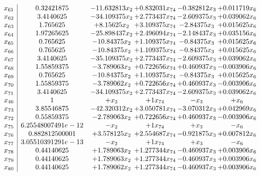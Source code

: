 \documentclass[11pt]{article}
\begin{document}
\[\begin{array}{c| c c@{\hskip 2pt} c@{\hskip 2pt} c@{\hskip 2pt} c@{\hskip 2pt} }
 x_{61}   &  0.32421875 & -11.632813 x_{2} & + 0.832031 x_{74} & -0.382812 x_{3} & + 0.011719 x_{6}\\
 x_{62}   &  3.4140625 & -34.109375 x_{2} & + 2.773437 x_{74} & -2.609375 x_{3} & + 0.039062 x_{6}\\
 x_{63}   &  1.765625 & + 8.15625 x_{2} & + 3.109375 x_{74} & -2.84375 x_{3} & + 0.015625 x_{6}\\
 x_{64}   &  1.97265625 & -25.898437 x_{2} & + 2.496094 x_{74} & -2.148437 x_{3} & + 0.035156 x_{6}\\
 x_{65}   &  0.765625 & -10.84375 x_{2} & + 1.109375 x_{74} & -0.84375 x_{3} & + 0.015625 x_{6}\\
 x_{66}   &  0.765625 & -10.84375 x_{2} & + 1.109375 x_{74} & -0.84375 x_{3} & + 0.015625 x_{6}\\
 x_{67}   &  3.4140625 & -35.109375 x_{2} & + 2.773437 x_{74} & -2.609375 x_{3} & + 0.039062 x_{6}\\
 x_{68}   &  1.55859375 & -3.789063 x_{2} & + 0.722656 x_{74} & + 0.460937 x_{3} & -0.003906 x_{6}\\
 x_{69}   &  0.765625 & -10.84375 x_{2} & + 1.109375 x_{74} & -0.84375 x_{3} & + 0.015625 x_{6}\\
 x_{70}   &  1.55859375 & -3.789062 x_{2} & + 0.722656 x_{74} & + 0.460937 x_{3} & -0.003906 x_{6}\\
 x_{71}   &  3.4140625 & -34.109375 x_{2} & + 2.773437 x_{74} & -2.609375 x_{3} & + 0.039062 x_{6}\\
 x_{46}   &  1 & +  x_{2} & + 1 x_{74} & - x_{3} & +  x_{6}\\
 x_{73}   &  3.85546875 & -42.320312 x_{2} & + 3.050781 x_{74} & -3.070312 x_{3} & + 0.042969 x_{6}\\
 x_{72}   &  0.55859375 & -2.789063 x_{2} & + 0.722656 x_{74} & + 0.460937 x_{3} & -0.003906 x_{6}\\
 x_{75}   &  6.25548007491e-12 & - x_{2} & + 1 x_{74} & +  x_{3} & - x_{6}\\
 x_{76}   &  0.882812500001 & + 3.578125 x_{2} & + 2.554687 x_{74} & -0.921875 x_{3} & + 0.007812 x_{6}\\
 x_{77}   &  3.05510391291e-13 & - x_{2} & + 1 x_{74} & +  x_{3} & - x_{6}\\
 x_{78}   &  0.44140625 & + 1.789063 x_{2} & + 1.277344 x_{74} & -0.460937 x_{3} & + 0.003906 x_{6}\\
 x_{79}   &  0.44140625 & + 1.789063 x_{2} & + 1.277344 x_{74} & -0.460937 x_{3} & + 0.003906 x_{6}\\
 x_{80}   &  0.44140625 & + 1.789062 x_{2} & + 1.277344 x_{74} & -0.460937 x_{3} & + 0.003906 x_{6}\\

\end{array}\]
\end{document}
